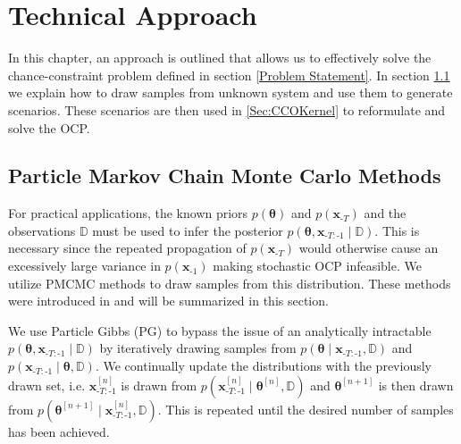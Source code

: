 \chapter{Technical Approach} \label{Technical Approach}

In this chapter, an approach is outlined that allows us to effectively solve the chance-constraint problem defined in section \ref{Problem Statement}. In section \ref{PGibbs sampling} we explain how to draw samples from unknown system and use them to generate scenarios. These scenarios are then used in \ref{Sec:CCOKernel} to reformulate and solve the OCP.

\section{Particle Markov Chain Monte Carlo Methods} \label{PGibbs sampling}

For practical applications, the known priors $p(\boldsymbol{\theta})$ and $p(\boldsymbol{x}_{\text{-}T})$ and the observations $\mathbb{D}$ must be used to infer the posterior $p(\boldsymbol{\theta}, \boldsymbol{x}_{\text{-}T:\text{-}1}\mid \mathbb{D})$. This is necessary since the repeated propagation of $p(\boldsymbol{x}_{\text{-}T})$ would otherwise cause an excessively large variance in $p(\boldsymbol{x}_{\text{-}1})$ making stochastic OCP infeasible. We utilize PMCMC methods to draw samples from this distribution. These methods were introduced in \cite{Andrieu_10} and will be summarized in this section.

We use Particle Gibbs (PG) to bypass the issue of an analytically intractable $p(\boldsymbol{\theta}, \boldsymbol{x}_{\text{-}T:\text{-}1}\mid \mathbb{D})$ by iteratively drawing samples from $p(\boldsymbol{\theta} \mid \boldsymbol{x}_{\text{-}T:\text{-}1}, \mathbb{D})$ and $p(\boldsymbol{x}_{\text{-}T:\text{-}1}\mid \boldsymbol{\theta}, \mathbb{D})$. We continually update the distributions with the previously drawn set, i.e. $\boldsymbol{x}_{\text{-}T:\text{-}1}^{[n]}$ is drawn from $p(\boldsymbol{x}_{\text{-}T:\text{-}1}^{[n]}\mid \boldsymbol{\theta}^{[n]}, \mathbb{D})$ and $\boldsymbol{\theta}^{[n+1]}$ is then drawn from $p(\boldsymbol{\theta}^{[n+1]}\mid \boldsymbol{x}_{\text{-}T:\text{-}1}^{[n]}, \mathbb{D})$. This is repeated until the desired number of samples has been achieved.


